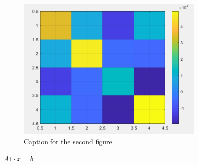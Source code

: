 \documentclass{article}
\begin{document}
\begin{figure}[hbt!]
\begin{subfigure}{0.45\linewidth}
            \includegraphics[width=\linewidth]{img/mat2.png}
            \caption{Caption for the second figure}
        \end{subfigure}

        \caption{$A1 \cdot x = b$}
        \label{fig:example2}
    \end{figure}
    
    \newpage
\end{document}

